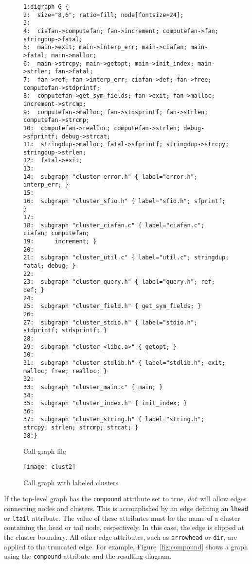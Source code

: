 \documentclass[11pt]{article}
\def\dot{{\it dot}}
\begin{document}
\begin{figure}[p]
\footnotesize
\begin{verbatim}
1:digraph G {
2:  size="8,6"; ratio=fill; node[fontsize=24];
3:
4:  ciafan->computefan; fan->increment; computefan->fan; stringdup->fatal;
5:  main->exit; main->interp_err; main->ciafan; main->fatal; main->malloc;
6:  main->strcpy; main->getopt; main->init_index; main->strlen; fan->fatal;
7:  fan->ref; fan->interp_err; ciafan->def; fan->free; computefan->stdprintf;
8:  computefan->get_sym_fields; fan->exit; fan->malloc; increment->strcmp;
9:  computefan->malloc; fan->stdsprintf; fan->strlen; computefan->strcmp;
10:  computefan->realloc; computefan->strlen; debug->sfprintf; debug->strcat;
11:  stringdup->malloc; fatal->sfprintf; stringdup->strcpy; stringdup->strlen;
12:  fatal->exit;
13:
14:  subgraph "cluster_error.h" { label="error.h"; interp_err; }
15:
16:  subgraph "cluster_sfio.h" { label="sfio.h"; sfprintf; }
17:
18:  subgraph "cluster_ciafan.c" { label="ciafan.c"; ciafan; computefan;
19:      increment; }
20:
21:  subgraph "cluster_util.c" { label="util.c"; stringdup; fatal; debug; }
22:
23:  subgraph "cluster_query.h" { label="query.h"; ref; def; }
24:
25:  subgraph "cluster_field.h" { get_sym_fields; }
26:
27:  subgraph "cluster_stdio.h" { label="stdio.h"; stdprintf; stdsprintf; }
28:
29:  subgraph "cluster_<libc.a>" { getopt; }
30:
31:  subgraph "cluster_stdlib.h" { label="stdlib.h"; exit; malloc; free; realloc; }
32:
33:  subgraph "cluster_main.c" { main; }
34:
35:  subgraph "cluster_index.h" { init_index; }
36:
37:  subgraph "cluster_string.h" { label="string.h"; strcpy; strlen; strcmp; strcat; }
38:}
\end{verbatim}
\caption{Call graph file}
\label{fig:clust2}
\end{figure}

\begin{figure}[p]
	\centerline {
		\texttt{[image: clust2]}
	}
    \caption{Call graph with labeled clusters}
	\label{fig:callgraph}
\end{figure}

If the top-level graph has the {\tt compound} attribute set to true,
\dot\ will allow edges connecting nodes and clusters. This is accomplished
by an edge defining an {\tt lhead} or {\tt ltail} attribute. The
value of these attributes must be the name of a cluster containing the
head or tail node, respectively. In this case, the edge is clipped at
the cluster boundary. All other edge attributes, such as {\tt arrowhead}
or {\tt dir}, are applied to the truncated edge. For example,
Figure~\ref{fig:compound} shows a graph using the {\tt compound} attribute
and the resulting diagram.
\end{document}
